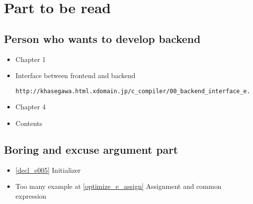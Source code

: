\section*{Part to be read}

\subsection*{Person who wants to develop backend}

\begin{itemize}
\item Chapter 1
\item Interface between frontend and backend
\begin{verbatim}
http://khasegawa.html.xdomain.jp/c_compiler/00_backend_interface_e.ppt
\end{verbatim}
\item Chapter 4
\item Contents
\end{itemize}

\subsection*{Boring and excuse argument part}
\begin{itemize}
\item \ref{decl_e005} Initializer
\item Too many example at \ref{optimize_e_assign} Assignment and common expression
\end{itemize}

